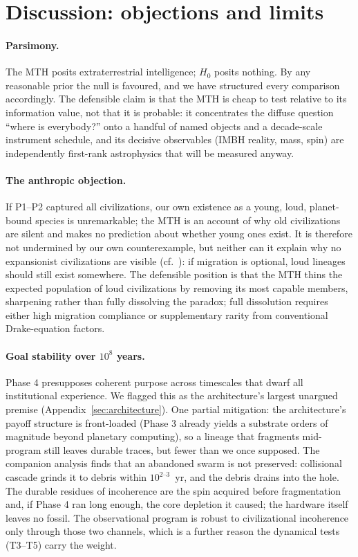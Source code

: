 \documentclass[11pt]{article}
\begin{document}
\section{Discussion: objections and limits}
\label{sec:discussion}

\paragraph{Parsimony.} The MTH posits extraterrestrial intelligence; $H_0$ posits nothing. By any reasonable prior the null is favoured, and we have structured every comparison accordingly. The defensible claim is that the MTH is cheap to test relative to its information value, not that it is probable: it concentrates the diffuse question ``where is everybody?'' onto a handful of named objects and a decade-scale instrument schedule, and its decisive observables (IMBH reality, mass, spin) are independently first-rank astrophysics that will be measured anyway.

\paragraph{The anthropic objection.} If P1--P2 captured all civilizations, our own existence as a young, loud, planet-bound species is unremarkable; the MTH is an account of why old civilizations are silent and makes no prediction about whether young ones exist. It is therefore not undermined by our own counterexample, but neither can it explain why no expansionist civilizations are visible (cf.\ \citealt{Hanson2021}): if migration is optional, loud lineages should still exist somewhere. The defensible position is that the MTH thins the expected population of loud civilizations by removing its most capable members, sharpening rather than fully dissolving the paradox; full dissolution requires either high migration compliance or supplementary rarity from conventional Drake-equation factors.

\paragraph{Goal stability over $10^{8}$ years.} Phase 4 presupposes coherent purpose across timescales that dwarf all institutional experience. We flagged this as the architecture's largest unargued premise (Appendix~\ref{sec:architecture}). One partial mitigation: the architecture's payoff structure is front-loaded (Phase 3 already yields a substrate orders of magnitude beyond planetary computing), so a lineage that fragments mid-program still leaves durable traces, but fewer than we once supposed. The companion analysis \citep{Swanson2026Engineered} finds that an abandoned swarm is not preserved: collisional cascade grinds it to debris within $10^{2\text{--}3}$~yr, and the debris drains into the hole. The durable residues of incoherence are the spin acquired before fragmentation and, if Phase 4 ran long enough, the core depletion it caused; the hardware itself leaves no fossil. The observational program is robust to civilizational incoherence only through those two channels, which is a further reason the dynamical tests (T3--T5) carry the weight.
\end{document}
